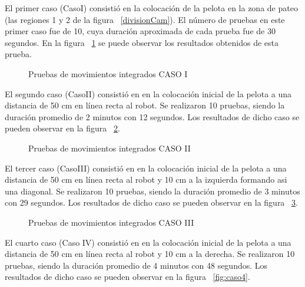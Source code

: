 El  primer caso (CasoI) consistió en la colocación de la pelota en la zona de pateo (las regiones 1 y 2 de la figura ~\ref{divisionCam}). El número de pruebas en este primer caso fue de 10, cuya duración aproximada de cada prueba fue de 30 segundos. En la figura ~\ref{fig:caso1} se puede observar los resultados obtenidos de esta prueba.

\begin{figure}
\caption{Pruebas de movimientos integrados CASO I}
\label{fig:caso1}
\end{figure}

El segundo caso (CasoII) consistió en en la colocación inicial de la pelota a una distancia de 50 cm en línea recta al robot. Se realizaron 10 pruebas, siendo la duración promedio de 2 minutos con 12 segundos. Los resultados de dicho caso se pueden observar en la figura ~\ref{fig:caso2}. 

\begin{figure}
\caption{Pruebas de movimientos integrados CASO II}
\label{fig:caso2}
\end{figure}

El tercer caso  (CasoIII) consistió en en la colocación inicial de la pelota a una distancia de 50 cm en línea recta al robot y 10 cm a la izquierda formando asi una diagonal. Se realizaron 10 pruebas, siendo la duración promedio de 3 minutos con 29 segundos. Los resultados de dicho caso se pueden observar en la figura ~\ref{fig:caso3}. 

\begin{figure}
\caption{Pruebas de movimientos integrados CASO III}
\label{fig:caso3}
\end{figure}

El cuarto caso (Caso IV) consistió en en la colocación inicial de la pelota a una distancia de 50 cm en línea recta al robot y 10 cm a la derecha. Se realizaron 10 pruebas, siendo la duración promedio de 4 minutos con 48 segundos. Los resultados de dicho caso se pueden observar en la figura ~\ref{fig:caso4}. 

